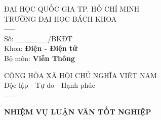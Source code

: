 \documentclass[12pt]{report}
\newcommand{\fontnormal}{\fontsize{8pt}{12pt}\selectfont}
\begin{document}
\newpage
{
\fontsize{10pt}{12pt}\selectfont
\begin{multicols}{2}
	\begin{center}
		\fontnormal
		ĐẠI HỌC QUỐC GIA TP. HỒ CHÍ MINH\\
		TRƯỜNG ĐẠI HỌC BÁCH KHOA\\
		-----\\
		Số: \_\_\_\_\_\_/BKĐT\\
		Khoa: \textbf{Điện - Điện tử}\\
		Bộ môn: \textbf{Viễn Thông}\\
	\end{center}
	\columnbreak
	\begin{center}
		\fontnormal
		CỘNG HÒA XÃ HỘI CHỦ NGHĨA VIÊT NAM\\
		Độc lập - Tự do - Hạnh phúc\\
		-----\\
	\end{center}
\end{multicols}

\begin{center}
{\large \textbf{NHIỆM VỤ LUẬN VĂN TỐT NGHIỆP} \par}
\end{center}

}
\end{document}
